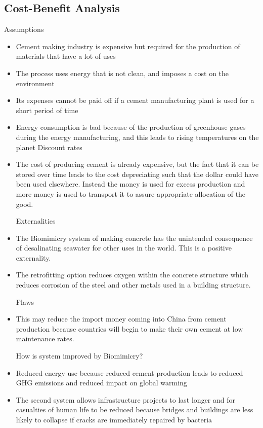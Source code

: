 \subsection{Cost-Benefit Analysis}

Assumptions
\begin{itemize}
	\item Cement making industry is expensive but required for the production of materials that have a lot of uses
	\item The process uses energy that is not clean, and imposes a cost on the environment
	\item Its expenses cannot be paid off if a cement manufacturing plant is used for a short period of time
	\item Energy consumption is bad because of the production of greenhouse gases during the energy manufacturing, and this leads to rising temperatures on the planet
Discount rates
	\item The cost of producing cement is already expensive, but the fact that it can be stored over time leads to the cost depreciating such that the dollar could have been used elsewhere. Instead the money is used for excess production and more money is used to transport it to assure appropriate allocation of the good.
	
Externalities

	\item The Biomimicry system of making concrete has the unintended consequence of desalinating seawater for other uses in the world. This is a positive externality.

	\item The retrofitting option reduces oxygen within the concrete structure which reduces corrosion of the steel and other metals used in a building structure.

Flaws

	\item This may reduce the import money coming into China from cement production because countries will begin to make their own cement at low maintenance rates.

How is system improved by Biomimicry?

	\item Reduced energy use because reduced cement production leads to reduced GHG emissions and reduced impact on global warming
	\item The second system allows infrastructure projects to last longer and for casualties of human life to be reduced because bridges and buildings are less likely to collapse if cracks are immediately repaired by bacteria
\end{itemize}

